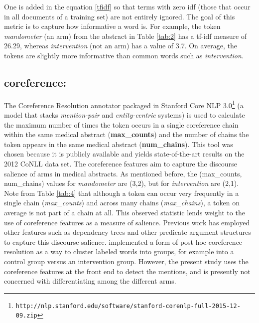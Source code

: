 One is added in the equation \eqref{tfidf} so that terms with zero idf (those that occur in all documents of a training set) are not entirely ignored. The goal of this metric is to capture how informative a word is. For example, the token \textit{mandometer} (an arm) from the abstract in Table \ref{tab:2} has a tf-idf measure of 26.29, whereas \textit{intervention} (not an arm) has a value of 3.7. On average, the tokens are slightly more informative than common words such as \textit{intervention}.

\subsection*{coreference:}\label{subsec:coref-features} The Coreference Resolution annotator packaged in Stanford Core NLP 3.0\footnote{\scriptsize {\tt http://nlp.stanford.edu/software/stanford-corenlp-full-2015-12-09.zip}} (a model that stacks \textit{mention-pair} and \textit{entity-centric} systems) is used to calculate the maximum number of times the token occurs in a single coreference chain within the same medical abstract (\textbf{max\_counts}) and the number of chains the token appears in the same medical abstract (\textbf{num\_chains}). This tool was chosen because it is publicly available and yields state-of-the-art results on the 2012 CoNLL data set. The coreference features aim to capture the discourse salience of arms in medical abstracts. As mentioned before, the (max\_counts, num\_chains) values for \textit{mandometer} are (3,2), but for \textit{intervention} are (2,1). Note from Table \ref{tab:4} that although a token can occur very frequently in a single chain (\textit{max\_counts}) and across many chains (\textit{max\_chains}), a token on average is not part of a chain at all. This observed statistic lends weight to the use of coreference features as a measure of salience. Previous work has employed other features such as dependency trees and other predicate argument structures to capture this discourse salience.  implemented a form of post-hoc coreference resolution as a way to cluster labeled words into groups, for example into a control group versus an intervention group. However, the present study uses the coreference features at the front end to detect the mentions, and is presently not concerned with differentiating among the different arms. 

